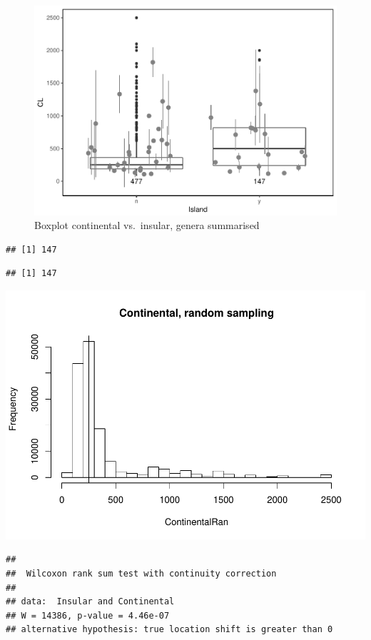\documentclass[]{article}
\begin{document}
\begin{figure}[htbp]
\centering
\includegraphics{MA_JJ_files/figure-latex/Boxplot continental vs. insular-1.pdf}
\caption{Boxplot continental vs.~insular, genera summarised}
\end{figure}

\begin{verbatim}
## [1] 147
\end{verbatim}

\begin{verbatim}
## [1] 147
\end{verbatim}

\includegraphics{MA_JJ_files/figure-latex/randon sampling island continental-1.pdf}

\begin{verbatim}
## 
##  Wilcoxon rank sum test with continuity correction
## 
## data:  Insular and Continental
## W = 14386, p-value = 4.46e-07
## alternative hypothesis: true location shift is greater than 0
\end{verbatim}
\end{document}

